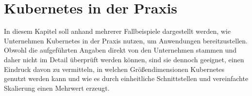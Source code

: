 \documentclass[11pt,a4paper]{article}
\begin{document}







\section{Kubernetes in der Praxis}
In diesem Kapitel soll anhand mehrerer Fallbeispiele dargestellt werden, wie Unternehmen
Kubernetes in der Praxis nutzen, um Anwendungen bereitzustellen.
Obwohl die aufgeführten Angaben direkt von den Unternehmen stammen und daher nicht im Detail
überprüft werden können, sind sie dennoch geeignet, einen Eindruck davon zu vermitteln,
in welchen Größendimensionen Kubernetes genutzt werden kann und wie es durch
einheitliche Schnittstellen und vereinfachte Skalierung
einen Mehrwert erzeugt.
\end{document}
